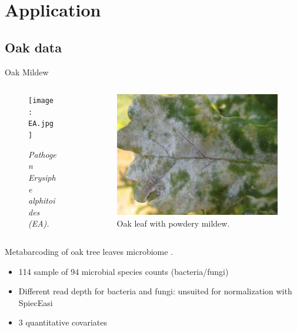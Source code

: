 \documentclass[9pt]{beamer}
\begin{document}
\section{Application}
\subsection{Oak data}


\begin{frame}{Oak Mildew}
\begin{columns}
\begin{column}{5cm}
\begin{figure}[htp]
\centering
\texttt{[image: EA.jpg]}
\caption{\textit{Pathogen Erysiphe alphitoides (EA).}}
\end{figure}
\end{column}
\begin{column}{6cm}
\begin{figure}[htp]
\centering
\includegraphics[scale=0.1]{mildew.jpg}
\caption{Oak leaf with powdery mildew.}
\end{figure}
\end{column}
\end{columns}
\vspace{0.5cm}
Metabarcoding of oak tree leaves microbiome \cite{jakuch}.\\

\begin{itemize}
	\item 114 sample of 94 microbial species counts (bacteria/fungi)
	\item Different read depth for bacteria and fungi: unsuited for normalization with SpiecEasi
	\item 3 quantitative covariates 
\end{itemize}
\end{frame}
\end{document}
